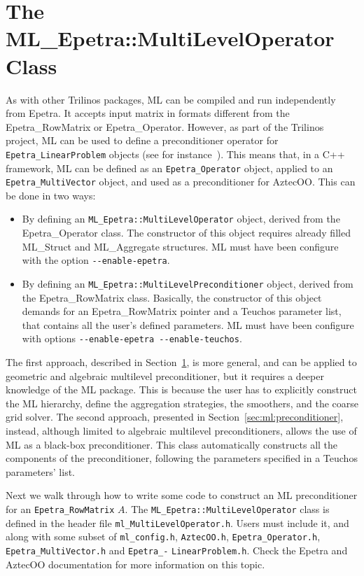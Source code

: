 \section{The ML\_Epetra::MultiLevelOperator Class}
\label{sec:ml:operator}
As with other Trilinos packages, ML can be compiled and run independently
from Epetra. It accepts input matrix in formats different
from the Epetra\_RowMatrix or Epetra\_Operator. However, as part of the
Trilinos project, ML can be used to define a preconditioner operator for
\verb!Epetra_LinearProblem! objects (see for
instance~\cite{Epetra-Ref-Guide-new}). This means that, in a C++ framework,
ML can be defined as an \verb!Epetra_Operator! object, applied to an
\verb!Epetra_MultiVector!  object, and used as a preconditioner for
AztecOO.  This can be done in two ways:
\begin{itemize}
\item By defining an \verb!ML_Epetra::MultiLevelOperator! object, derived from the
  Epetra\_\-Operator class. The constructor of this object requires
  already filled ML\_Struct and ML\_Aggregate structures.  ML must have
  been configure with the option \newline \verb!--enable-epetra!.
\item By defining an \verb!ML_Epetra::MultiLevelPreconditioner! object, derived
  from the Epetra\_RowMatrix class. Basically, the constructor of
  this object demands for an Epetra\_RowMatrix  pointer and a
  Teuchos parameter list, that contains all the user's defined
  parameters. ML must have been configure with options \newline
  \verb!--enable-epetra --enable-teuchos!.
\end{itemize}

The first approach, described in Section~\ref{sec:ml:operator}, is more
general, and can be applied to geometric and algebraic multilevel
preconditioner, but it requires a deeper knowledge of the ML package.
This is because the user has to explicitly construct the ML hierarchy,
define the aggregation strategies, the smoothers, and the coarse grid
solver. The second approach, presented in
Section~\ref{sec:ml:preconditioner}, instead, although limited to algebraic
multilevel preconditioners, allows the use of ML as a black-box
preconditioner. This class automatically constructs all the components
of the preconditioner, following the parameters specified in a Teuchos
parameters' list. 

Next we walk through how to write some code to
construct an ML preconditioner for an \verb!Epetra_RowMatrix! $A$.
The \verb!ML_Epetra::MultiLevelOperator! class 
is defined in the header file \verb!ml_MultiLevelOperator.h!.
Users must include it, and along with some subset of
\verb!ml_config.h!,
\verb!AztecOO.h!,
\verb!Epetra_Operator.h!, 
\verb!Epetra_MultiVector.h!
and
\verb!Epetra_-!
\verb!LinearProblem.h!.
Check the Epetra and AztecOO documentation for more information on this topic.

